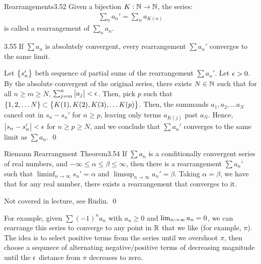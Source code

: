 \setcounter{rudin}{51}
\begin{definition}{Rearrangements}{3.52}
    Given a bijection $K: \mathbb{N} \rightarrow \mathbb{N}$, the series:
    \begin{align*}
        \sum_n a_n' = \sum_n a_{K(n)}
    \end{align*}
    is called a rearrangement of $\sum_n a_n$. 
\end{definition}

\setcounter{rudin}{54}
\begin{theorem}{}{3.55}
    If $\sum a_n$ is absolutely convergent, every rearrangement $\sum a_n'$ converges to the same limit.
\end{theorem}
\begin{nproof}
    Let $\set{s_n'}$ beth sequence of partial sums of the rearrangement $\sum a_n'$. Let $\epsilon > 0$. By the absolute convergent of the original series, there exists $N \in \mathbb{N}$ such that for all $n \geq m \geq N$, $\sum_{j=m}^n \abs{a_j} < \epsilon$. Then, pick $p$ such that $\set{1, 2, \ldots N} \subset \set{K(1), K(2), K(3), \ldots K(p)}$. Then, the summands $a_1, a_2, \ldots a_N$ cancel out in $s_n - s_n'$ for $n \geq p$, leaving only terms $a_{K(j)}$ past $a_N$. Hence, $\abs{s_n - s_n'} < \epsilon$ for $n \geq p \geq N$, and we conclude that $\sum a_n'$ converges to the same limit as $\sum a_n$. \qed
\end{nproof}

\setcounter{rudin}{53}
\begin{theorem}{Riemann Rearrangment Theorem}{3.54}
    If $\sum a_n$ is a conditionally convergent series of real numbers, and $- \infty \leq \alpha \leq \beta \leq \infty$, then there is a rearrangement $\sum a_n'$ such that $\liminf_{n \rightarrow \infty} s_n' = \alpha$ and $\limsup_{n \rightarrow \infty} a_n' = \beta$. Taking $\alpha = \beta$, we have that for any real number, there exists a rearrangement that converges to it. 
\end{theorem}
\begin{nproof}
    Not covered in lecture, see Rudin. \qed
\end{nproof}
\noindent For example, given $\sum (-1)^n a_n$ with $a_n \geq 0$ and $\lim_{n \rightarrow \infty} a_n = 0$, we can rearrange this series to converge to any point in $\mathbb{R}$ that we like (for example, $\pi$). The idea is to select positive terms from the series until we overshoot $\pi$, then choose a sequnece of alternating negative/positive terms of decreasing magnitude until the $\epsilon$ distance from $\pi$ decreases to zero.

